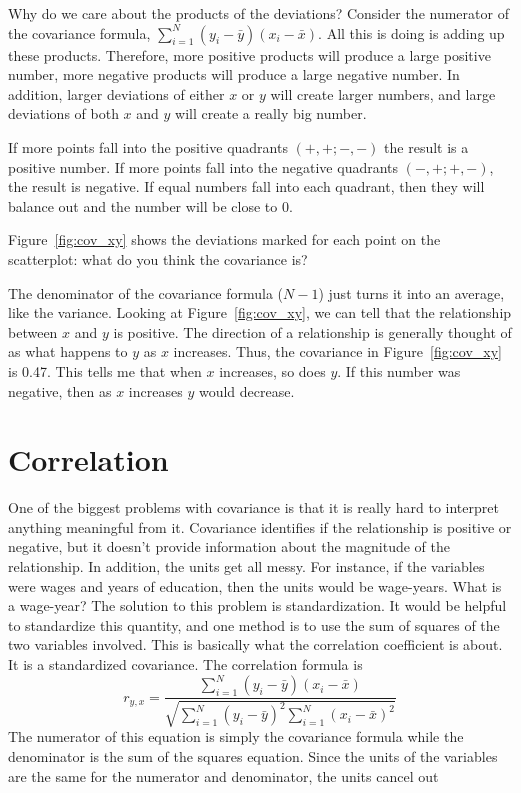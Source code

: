 Why do we care about the products of the deviations? Consider the numerator of the covariance formula, $\sum_{i=1}^N\left(y_i-\bar{y}\right)\left(x_i-\bar{x}\right)$. All this is doing is adding up these products. Therefore, more positive products will produce a large positive number, more negative products will produce a large negative number. In addition, larger deviations of either $x$ or $y$ will create larger numbers, and large deviations of both $x$ and $y$ will create a really big number.

If more points fall into the positive quadrants $(+,+; -,-)$ the result is a positive number. If more points fall into the negative quadrants $(-,+;+,-)$, the result is negative. If equal numbers fall into each quadrant, then they will balance out and the number will be close to 0.

Figure~\ref{fig:cov_xy} shows the deviations marked for each point on the scatterplot: what do you think the covariance is?

The denominator of the covariance formula ($N-1$) just turns it into an average, like the variance. Looking at Figure~\ref{fig:cov_xy}, we can tell that the relationship between $x$ and $y$ is positive. The direction of a relationship is generally thought of as what happens to $y$ as $x$ increases. Thus, the covariance in Figure~\ref{fig:cov_xy} is 0.47. This tells me that when $x$ increases, so does $y$. If this number was negative, then as $x$ increases $y$ would decrease.
\section{Correlation}
One of the biggest problems with covariance is that it is really hard to interpret anything meaningful from it. Covariance identifies if the relationship is positive or negative, but it doesn't provide information about the magnitude of the relationship. In addition, the units get all messy. For instance, if the variables were wages and years of education, then the units would be wage-years. What is a wage-year? The solution to this problem is standardization. It would be helpful to standardize this quantity, and one method is to use the sum of squares of the two variables involved. This is basically what the correlation coefficient is about. It is a standardized covariance. The correlation formula is
\begin{equation}
  r_{y,x}=\frac{\sum_{i=1}^N\left(y_i-\bar{y}\right)\left(x_i-\bar{x}\right)}{\sqrt{\sum_{i=1}^N\left(y_i-\bar{y}\right)^2\sum_{i=1}^N\left(x_i-\bar{x}\right)^2}}
\end{equation}
The numerator of this equation is simply the covariance formula while the denominator is the sum of the squares equation. Since the units of the variables are the same for the numerator and denominator, the units cancel out

